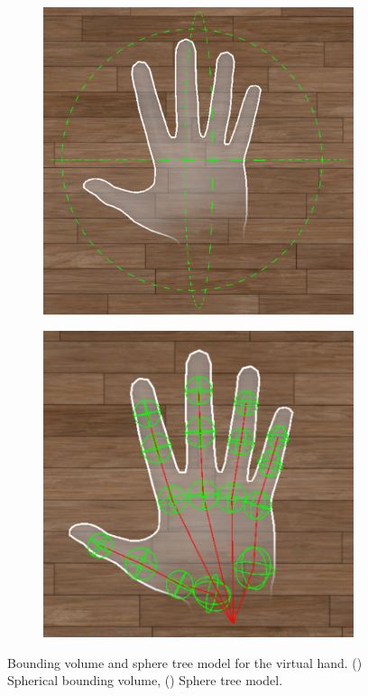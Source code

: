 \documentclass[runningheads]{llncs}
\begin{document}
\begin{figure}
  \begin{subfigure}{0.48\linewidth} %
    \centering
    \includegraphics[width=\linewidth]{image/bounding-volume.pdf}
    \caption{} %
    \label{fig:bounding-volume}
  \end{subfigure}
  \hfill %
  \begin{subfigure}{0.48\linewidth} %
    \centering
    \includegraphics[width=\linewidth]{image/sphere-tree-model.pdf}
    \caption{} %
    \label{fig:sphere-tree-model}
  \end{subfigure}
  \caption{Bounding volume and sphere tree model for the virtual hand. () Spherical bounding volume, () Sphere tree model.}
  \label{fig:bounding-volume-and-sphere-tree-model}
\end{figure}
\end{document}
